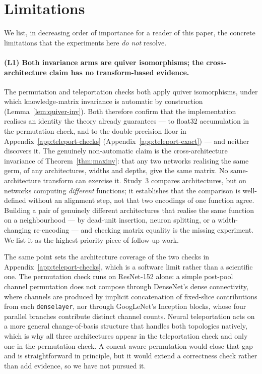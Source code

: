 \section{Limitations}
\label{sec:limitations}

We list, in decreasing order of importance for a reader of this paper,
the concrete limitations that the experiments here \emph{do not} resolve.

\paragraph{(L1) Both invariance arms are quiver isomorphisms; the
cross-architecture claim has no transform-based evidence.}
The permutation and teleportation checks both apply quiver
isomorphisms, under which knowledge-matrix invariance is automatic by
construction (Lemma~\ref{lem:quiver-inv}). Both therefore confirm that the
implementation realises an identity the theory already guarantees --- to float32
accumulation in the permutation check, and to the double-precision floor in Appendix~\ref{app:teleport-checks}
(Appendix~\ref{app:teleport-exact}) --- and neither discovers it. The genuinely
non-automatic claim is the cross-architecture invariance of
Theorem~\ref{thm:maxinv}: that any two networks realising the same germ, of any
architectures, widths and depths, give the same matrix. No same-architecture
transform can exercise it. Study~3 compares architectures, but on networks
computing \emph{different} functions; it establishes that the comparison is
well-defined without an alignment step, not that two encodings of one function
agree. Building a pair of genuinely different architectures that realise the same
function on a neighbourhood --- by dead-unit insertion, neuron splitting, or a
width-changing re-encoding --- and checking matrix equality is the missing
experiment. We list it as the highest-priority piece of follow-up work.

The same point sets the architecture coverage of the two checks in
Appendix~\ref{app:teleport-checks}, which is a software limit rather than a
scientific one. The permutation check runs on ResNet-152 alone: a simple
post-pool channel permutation does not compose through DenseNet's dense
connectivity, where channels are produced by implicit concatenation of
fixed-slice contributions from each \texttt{denselayer}, nor through GoogLeNet's
Inception blocks, whose four parallel branches contribute distinct channel
counts. Neural teleportation \citep{armenta2024neural} acts on a more general
change-of-basis structure that handles both topologies natively, which is why
all three architectures appear in the teleportation check and only one in the
permutation check. A concat-aware permutation would close that gap and is
straightforward in principle, but it would extend a correctness check rather
than add evidence, so we have not pursued it.

